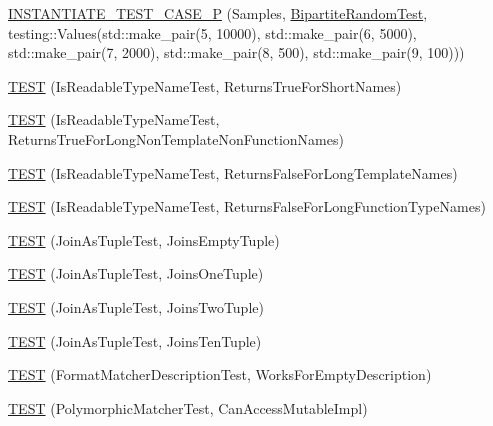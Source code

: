 \begin{DoxyCompactItemize}
\item 
\hyperlink{namespacetesting_1_1gmock__matchers__test_a857f48ffb1fc6f5ce61aec79b5c94da8}{I\+N\+S\+T\+A\+N\+T\+I\+A\+T\+E\+\_\+\+T\+E\+S\+T\+\_\+\+C\+A\+S\+E\+\_\+P} (Samples, \hyperlink{classtesting_1_1gmock__matchers__test_1_1_bipartite_random_test}{Bipartite\+Random\+Test}, testing\+::\+Values(std\+::make\+\_\+pair(5, 10000), std\+::make\+\_\+pair(6, 5000), std\+::make\+\_\+pair(7, 2000), std\+::make\+\_\+pair(8, 500), std\+::make\+\_\+pair(9, 100)))
\item 
\hyperlink{namespacetesting_1_1gmock__matchers__test_aef0bf5f855b1e75c63ec45408b5a23ba}{T\+E\+ST} (Is\+Readable\+Type\+Name\+Test, Returns\+True\+For\+Short\+Names)
\item 
\hyperlink{namespacetesting_1_1gmock__matchers__test_a839515535e3e75d4f80ba6ae8f7347ec}{T\+E\+ST} (Is\+Readable\+Type\+Name\+Test, Returns\+True\+For\+Long\+Non\+Template\+Non\+Function\+Names)
\item 
\hyperlink{namespacetesting_1_1gmock__matchers__test_ad1630d47de9f4fcdc00ab4962eaeea05}{T\+E\+ST} (Is\+Readable\+Type\+Name\+Test, Returns\+False\+For\+Long\+Template\+Names)
\item 
\hyperlink{namespacetesting_1_1gmock__matchers__test_a30516b1c70e14132d1d87ab08b96aa2f}{T\+E\+ST} (Is\+Readable\+Type\+Name\+Test, Returns\+False\+For\+Long\+Function\+Type\+Names)
\item 
\hyperlink{namespacetesting_1_1gmock__matchers__test_aa633c0b7e0f0316c23bff10e9963f773}{T\+E\+ST} (Join\+As\+Tuple\+Test, Joins\+Empty\+Tuple)
\item 
\hyperlink{namespacetesting_1_1gmock__matchers__test_acaec7fcf41bb1cdf7124b443e7ab28e8}{T\+E\+ST} (Join\+As\+Tuple\+Test, Joins\+One\+Tuple)
\item 
\hyperlink{namespacetesting_1_1gmock__matchers__test_a0831a9160c5420fcd363e4a520f0fb61}{T\+E\+ST} (Join\+As\+Tuple\+Test, Joins\+Two\+Tuple)
\item 
\hyperlink{namespacetesting_1_1gmock__matchers__test_a56811b12ff298040a3d44dba0a2e4a8e}{T\+E\+ST} (Join\+As\+Tuple\+Test, Joins\+Ten\+Tuple)
\item 
\hyperlink{namespacetesting_1_1gmock__matchers__test_ae104f652fab7d1b3c3873f6987401481}{T\+E\+ST} (Format\+Matcher\+Description\+Test, Works\+For\+Empty\+Description)
\item 
\hyperlink{namespacetesting_1_1gmock__matchers__test_ae29925e94a9396fe3c7fab6efaff8d8a}{T\+E\+ST} (Polymorphic\+Matcher\+Test, Can\+Access\+Mutable\+Impl)
\item 

\end{DoxyCompactItemize}
